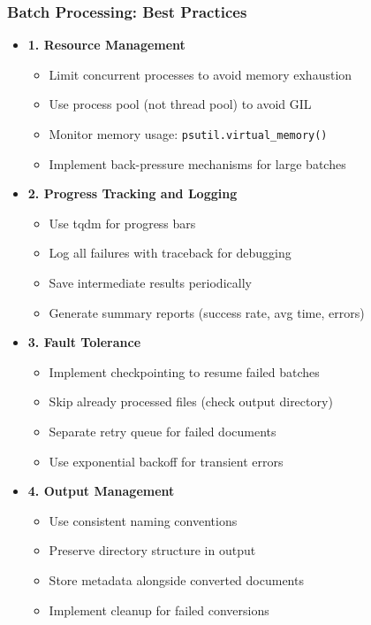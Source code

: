 \begin{frame}[fragile]\frametitle{Batch Processing: Best Practices}
      \begin{itemize}
        \item \textbf{1. Resource Management}
        \begin{itemize}
            \item Limit concurrent processes to avoid memory exhaustion
            \item Use process pool (not thread pool) to avoid GIL
            \item Monitor memory usage: \texttt{psutil.virtual\_memory()}
            \item Implement back-pressure mechanisms for large batches
        \end{itemize}
        \item \textbf{2. Progress Tracking and Logging}
        \begin{itemize}
            \item Use tqdm for progress bars
            \item Log all failures with traceback for debugging
            \item Save intermediate results periodically
            \item Generate summary reports (success rate, avg time, errors)
        \end{itemize}
        \item \textbf{3. Fault Tolerance}
        \begin{itemize}
            \item Implement checkpointing to resume failed batches
            \item Skip already processed files (check output directory)
            \item Separate retry queue for failed documents
            \item Use exponential backoff for transient errors
        \end{itemize}
        \item \textbf{4. Output Management}
        \begin{itemize}
            \item Use consistent naming conventions
            \item Preserve directory structure in output
            \item Store metadata alongside converted documents
            \item Implement cleanup for failed conversions
        \end{itemize}
      \end{itemize}
\end{frame}


